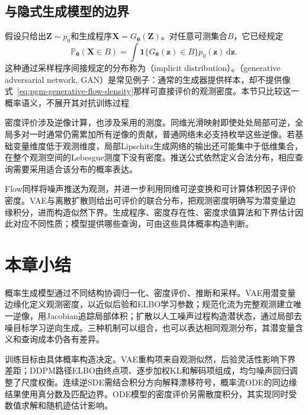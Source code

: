 \subsection{与隐式生成模型的边界}
\label{sec:pgm-generative-implicit-boundary}

假设只给出$\bm{Z}\sim p_0$和生成程序$\bm{X}=G_{\bm{\theta}}(\bm{Z})$。对任意可测集合$B$，它已经规定
\begin{equation}
  \label{eq:pgm-generative-pushforward}
  \mathbb{P}_{\bm{\theta}}(\bm{X}\in B)
  =\int \mathbf{1}\{G_{\bm{\theta}}(\bm{z})\in B\}
           p_0(\bm{z})\,\mathrm{d}\bm{z}.
\end{equation}
这种通过采样程序间接规定的分布称为（implicit distribution）。（generative adversarial network, GAN）是常见例子：通常的生成器提供样本，却不提供像式~\eqref{eq:pgm-generative-flow-density}那样可直接评价的观测密度。本节只比较这一概率语义，不展开其对抗训练过程

密度评价涉及逆像计算，也涉及采用的测度。同维光滑映射即使处处局部可逆，全局多对一时通常仍需累加所有逆像的贡献，普通网络未必支持枚举这些逆像。若基础变量维度低于观测维度，局部Lipschitz生成网络的输出还可能集中于低维集合，在整个观测空间的Lebesgue测度下没有密度。推送公式依然定义合法分布，相应查询需要采用适合该分布的概率表达。

Flow同样将噪声推送为观测，并进一步利用同维可逆变换和可计算体积因子评价密度。VAE与离散扩散则给出可评价的联合分布，把观测密度明确写为潜变量边缘积分，进而构造似然下界。生成程序、密度存在性、密度求值算法和下界估计因此对应不同性质；模型提供哪些查询，可由这些具体概率构造判断。

\section{本章小结}
\label{sec:pgm-generative-summary}

概率生成模型通过不同结构协调归一化、密度评价、推断和采样。VAE用潜变量边缘化定义观测密度，以近似后验和ELBO学习参数；规范化流为完整观测建立唯一逆像，用Jacobian追踪局部体积；扩散以人工噪声过程构造潜状态，通过局部去噪目标学习逆向生成。三种机制可以组合，也可以表达相同观测分布，其潜变量含义和查询成本仍各有差异。

训练目标由具体概率构造决定。VAE重构项来自观测似然，后验灵活性影响下界差距；DDPM路径ELBO由终点项、逐步加权KL和解码项组成，均匀噪声回归调整了尺度权衡。连续逆SDE需结合积分方向解释漂移符号，概率流ODE的同边缘结果使用真分数及匹配边界。ODE模型的密度评价另需散度积分，其实现同时受数值求解和随机迹估计影响。

